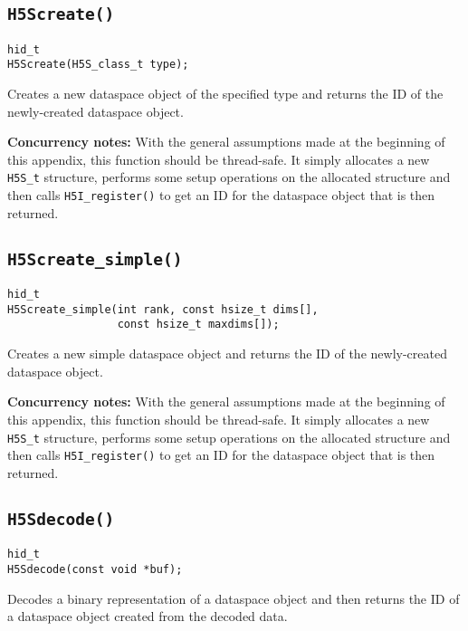 \documentclass[../HDF5_RFC.tex]{subfiles}
\begin{document}
\subsection{\texttt{H5Screate()}}
\label{apdx:h5s_func_h5screate}

\begin{verbatim}
hid_t
H5Screate(H5S_class_t type);
\end{verbatim}

Creates a new dataspace object of the specified type and returns the ID of the newly-created
dataspace object.

\textbf{Concurrency notes:} With the general assumptions made at the beginning of this
appendix, this function should be thread-safe. It simply allocates a new \texttt{H5S\_t}
structure, performs some setup operations on the allocated structure and then calls
\texttt{H5I\_register()} to get an ID for the dataspace object that is then returned.

\subsection{\texttt{H5Screate\_simple()}}
\label{apdx:h5s_func_h5screate_simple}

\begin{verbatim}
hid_t
H5Screate_simple(int rank, const hsize_t dims[],
                 const hsize_t maxdims[]);
\end{verbatim}

Creates a new simple dataspace object and returns the ID of the newly-created dataspace
object.

\textbf{Concurrency notes:} With the general assumptions made at the beginning of this
appendix, this function should be thread-safe. It simply allocates a new \texttt{H5S\_t}
structure, performs some setup operations on the allocated structure and then calls
\texttt{H5I\_register()} to get an ID for the dataspace object that is then returned.

\subsection{\texttt{H5Sdecode()}}
\label{apdx:h5s_func_h5sdecode}

\begin{verbatim}
hid_t
H5Sdecode(const void *buf);
\end{verbatim}

Decodes a binary representation of a dataspace object and then returns the ID of a
dataspace object created from the decoded data.
\end{document}
